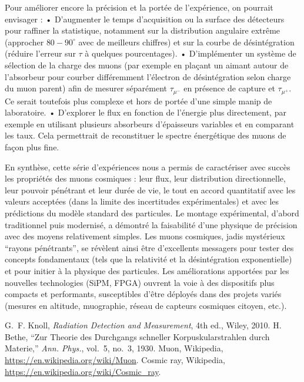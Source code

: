 \documentclass[a4paper,12pt,twoside]{article}
\begin{document}
Pour améliorer encore la précision et la portée de l’expérience, on pourrait envisager :
	•	D’augmenter le temps d’acquisition ou la surface des détecteurs pour raffiner la statistique, notamment sur la distribution angulaire extrême (approcher $80-90^\circ$ avec de meilleurs chiffres) et sur la courbe de désintégration (réduire l’erreur sur $\tau$ à quelques pourcentages).
	•	D’implémenter un système de sélection de la charge des muons (par exemple en plaçant un aimant autour de l’absorbeur pour courber différemment l’électron de désintégration selon charge du muon parent) afin de mesurer séparément $\tau_{\mu^-}$ en présence de capture et $\tau_{\mu^+}$. Ce serait toutefois plus complexe et hors de portée d’une simple manip de laboratoire.
	•	D’explorer le flux en fonction de l’énergie plus directement, par exemple en utilisant plusieurs absorbeurs d’épaisseurs variables et en comparant les taux. Cela permettrait de reconstituer le spectre énergétique des muons de façon plus fine.

En synthèse, cette série d’expériences nous a permis de caractériser avec succès les propriétés des muons cosmiques : leur flux, leur distribution directionnelle, leur pouvoir pénétrant et leur durée de vie, le tout en accord quantitatif avec les valeurs acceptées (dans la limite des incertitudes expérimentales) et avec les prédictions du modèle standard des particules. Le montage expérimental, d’abord traditionnel puis modernisé, a démontré la faisabilité d’une physique de précision avec des moyens relativement simples. Les muons cosmiques, jadis mystérieux “rayons pénétrants”, se révèlent ainsi être d’excellents messagers pour tester des concepts fondamentaux (tels que la relativité et la désintégration exponentielle) et pour initier à la physique des particules. Les améliorations apportées par les nouvelles technologies (SiPM, FPGA) ouvrent la voie à des dispositifs plus compacts et performants, susceptibles d’être déployés dans des projets variés (mesures en altitude, muographie, réseau de capteurs cosmiques citoyen, etc.).

\begin{thebibliography}{9}
 G.~F. Knoll, \emph{Radiation Detection and Measurement}, 4th ed., Wiley, 2010.
 H. Bethe, ``Zur Theorie des Durchgangs schneller Korpuskularstrahlen durch Materie,'' \emph{Ann. Phys.}, vol.~5, no.~3, 1930.
 Muon, Wikipedia, \url{https://en.wikipedia.org/wiki/Muon}.
 Cosmic ray, Wikipedia, \url{https://en.wikipedia.org/wiki/Cosmic_ray}.
\end{thebibliography}
\end{document}
